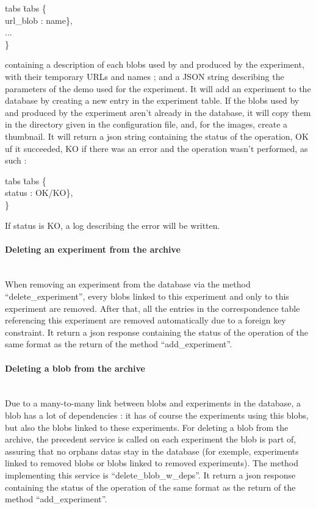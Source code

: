 \begin{tabbing}
tabs \= tabs \kill
\{ \\
\>url\_blob : name\}, \\
\> ... \\
\} \\
\end{tabbing}

containing a description of each blobs used by and produced by the experiment, with their temporary URLs and names ; and a JSON string describing the parameters of the demo used for the experiment. It will add an experiment to the database by creating a new entry in the experiment table. If the blobs used by and produced by the experiment aren't already in the database, it will copy them in the directory given in the configuration file, and, for the images, create a thumbnail. It will return a json string containing the status of the operation, OK uf it succeeded, KO if there was an error and the operation wasn't performed, as such :

\begin{tabbing}
tabs \= tabs \kill
\{ \\
\>status : OK/KO\}, \\
\} \\
\end{tabbing}

If status is KO, a log describing the error will be written.

\paragraph{Deleting an experiment from the archive} \hspace{0pt} \\
When removing an experiment from the database via the method ``delete\_experiment'', every blobs linked to this experiment and only to this experiment are removed. After that, all the entries in the correspondence table referencing this experiment are removed automatically due to a foreign key constraint. It return a json response containing the status of the operation of the same format as the return of the method ``add\_experiment''.

\paragraph{Deleting a blob from the archive} \hspace{0pt} \\
Due to a many-to-many link between blobs and experiments in the database, a blob has a lot of dependencies : it has of course the experiments using this blobs, but also the blobs linked to these experiments. For deleting a blob from the archive, the precedent service is called on each experiment the blob is part of, assuring that no orphans datas stay in the database (for exemple, experiments linked to removed blobs or blobs linked to removed experiments). The method implementing this service is ``delete\_blob\_w\_deps''. It return a json response containing the status of the operation of the same format as the return of the method ``add\_experiment''.

